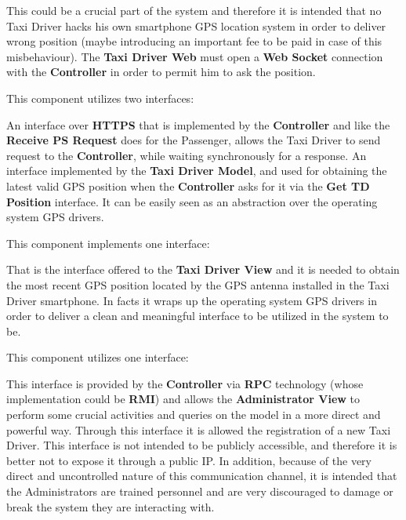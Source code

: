 \begin{itemize}
\begin{itemize}
		This could be a crucial part of the system and therefore it is intended that no Taxi Driver hacks his own smartphone GPS location system in order to deliver wrong position (maybe introducing an important fee to be paid in case of this misbehaviour).
		The \textbf{Taxi Driver Web} must open a \textbf{Web Socket} connection with the \textbf{Controller} in order to permit him to ask the position.
	\end{itemize}
	This component utilizes two interfaces:
	\begin{itemize}
		 An interface over \textbf{HTTPS} that is implemented by the \textbf{Controller} and like the \textbf{Receive PS Request} does for the Passenger, allows the Taxi Driver to send request to the \textbf{Controller}, while waiting synchronously for a response.
		 An interface implemented by the \textbf{Taxi Driver Model}, and used for obtaining the latest valid GPS position when the \textbf{Controller} asks for it via the \textbf{Get TD Position} interface.
		It can be easily seen as an abstraction over the operating system GPS drivers.
	\end{itemize}
	\itemBold{Taxi Driver Model}
	This component implements one interface:
	\begin{itemize}
		 That is the interface offered to the \textbf{Taxi Driver View} and it is needed to obtain the most recent GPS position located by the GPS antenna installed in the Taxi Driver smartphone.
		In facts it wraps up the operating system GPS drivers in order to deliver a clean and meaningful interface to be utilized in the system to be.
	\end{itemize}
	\itemBold{Administration View}
	This component utilizes one interface:
	\begin{itemize}
		 This interface is provided by the \textbf{Controller} via \textbf{RPC} technology (whose implementation could be \textbf{RMI}) and allows the \textbf{Administrator View} to perform some crucial activities and queries on the \myTaxiService{} model in a more direct and powerful way. Through this interface it is allowed the registration of a new Taxi Driver.
		This interface is not intended to be publicly accessible, and therefore it is better not to expose it through a public IP.
		In addition, because of the very direct and uncontrolled nature of this communication channel, it is intended that the Administrators are trained personnel and are very discouraged to damage or break the system they are interacting with.

\end{itemize}
\end{itemize}

